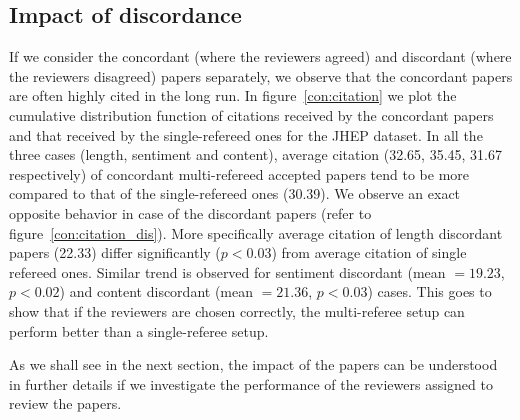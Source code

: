 \subsection{Impact of discordance}
If we consider the concordant (where the reviewers agreed) and discordant (where the reviewers
disagreed) papers separately, we observe that the concordant papers are often highly cited in the long run. In figure~\ref{con:citation} 
we plot the cumulative distribution function 
of citations received by the concordant papers and that received by the single-refereed ones for the JHEP dataset. 
In all the three cases (length, sentiment and content), average citation (32.65, 35.45, 31.67 respectively) of concordant multi-refereed 
accepted papers tend to be more compared to that of the single-refereed ones (30.39). We 
observe an exact opposite behavior in case of the discordant papers (refer to figure~\ref{con:citation_dis}). 
More specifically average citation of length discordant papers (22.33) differ significantly ($p < 0.03$) from average citation of single refereed ones. Similar trend is observed 
for sentiment discordant (mean $=19.23$, $p < 0.02$) and content discordant (mean $=21.36$, $p < 0.03$) cases. 
This goes to show that if the reviewers are chosen correctly, the multi-referee setup can perform better than a single-referee setup. 

As we shall see in the next section, the impact  of  the papers can be understood in further details if we  investigate the performance of the reviewers assigned to review 
the papers. 




